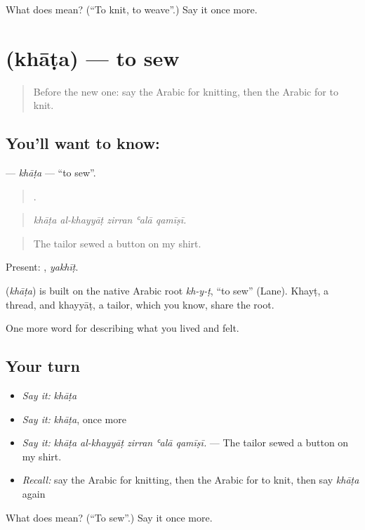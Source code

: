 \begin{tcolorbox}[breakable,colback=teal!4,colframe=teal!35!black,title={Before you move on}]
What does  mean? (\textquotedblleft{}To knit, to weave\textquotedblright{}.) Say it once more.
\end{tcolorbox}
\section[\texorpdfstring{\ar{خاط} (khāṭa)}{خاط (khāṭa)}]{ (khāṭa) — to sew}

\label{lesson:AR-C538-khata}



\begin{quote}
Before the new one: say the Arabic for knitting, then the Arabic for to knit.
\end{quote}

\subsection*{You'll want to know: }
\textbf{} — \emph{khāṭa} — \textquotedblleft{}to sew\textquotedblright{}.

\begin{quote}
    .
\end{quote}

\begin{quote}
\emph{khāṭa al-khayyāṭ zirran ʿalā qamīṣī.}
\end{quote}

\begin{quote}
The tailor sewed a button on my shirt.
\end{quote}

Present: , \emph{yakhīṭ}.

\begin{cousinweb}
\textbf{} (\emph{khāṭa}) is built on the native Arabic root \emph{kh-y-ṭ}, \textquotedblleft{}to sew\textquotedblright{} (Lane). Khayṭ, a thread, and khayyāṭ, a tailor, which you know, share the root.
\end{cousinweb}

\begin{grammarlens}[title={What you've built}]
One more word for describing what you lived and felt.
\end{grammarlens}

\subsection*{Your turn}
\begin{itemize}
\raggedright
  \item \emph{Say it:} \emph{khāṭa}
  \item \emph{Say it:} \emph{khāṭa}, once more
  \item \emph{Say it:} \emph{khāṭa al-khayyāṭ zirran ʿalā qamīṣī.} — The tailor sewed a button on my shirt.
  \item \emph{Recall:} say the Arabic for knitting, then the Arabic for to knit, then say \emph{khāṭa} again
\end{itemize}

\begin{tcolorbox}[breakable,colback=teal!4,colframe=teal!35!black,title={Before you move on}]
What does  mean? (\textquotedblleft{}To sew\textquotedblright{}.) Say it once more.
\end{tcolorbox}
